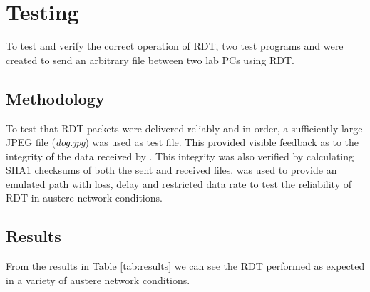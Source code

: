 \section{Testing}

To test and verify the correct operation of RDT, two test programs  and  were created to send an arbitrary file between two lab PCs using RDT. 

\subsection{Methodology}

To test that RDT packets were delivered reliably and in-order, a sufficiently large JPEG file (\emph{dog.jpg}) was used as test file. This provided visible feedback as to the integrity of the data received by . This integrity was also verified by calculating SHA1 checksums of both the sent and received files.  was used to provide an emulated path with loss, delay and restricted data rate to test the reliability of RDT in austere network conditions.

\subsection{Results}

From the results in Table \ref{tab:results} we can see the RDT performed as expected in a variety of austere network conditions.

